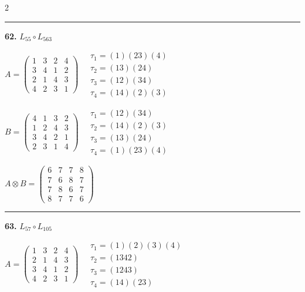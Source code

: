 \begin{multicols}{2}
\vspace{0.3em}
\hrule
\vspace{0.3em}

\noindent\textbf{62.} $L_{55} \circ L_{563}$

$A = \begin{pmatrix} 1 & 3 & 2 & 4 \\ 3 & 4 & 1 & 2 \\ 2 & 1 & 4 & 3 \\ 4 & 2 & 3 & 1 \end{pmatrix} \quad \begin{matrix} \tau_{1}=(1)(2 3)(4) \\ \tau_{2}=(1 3)(2 4) \\ \tau_{3}=(1 2)(3 4) \\ \tau_{4}=(1 4)(2)(3) \end{matrix}$

$B = \begin{pmatrix} 4 & 1 & 3 & 2 \\ 1 & 2 & 4 & 3 \\ 3 & 4 & 2 & 1 \\ 2 & 3 & 1 & 4 \end{pmatrix} \quad \begin{matrix} \tau_{1}=(1 2)(3 4) \\ \tau_{2}=(1 4)(2)(3) \\ \tau_{3}=(1 3)(2 4) \\ \tau_{4}=(1)(2 3)(4) \end{matrix}$

$A \otimes B = \begin{pmatrix} 6 & 7 & 7 & 8 \\ 7 & 6 & 8 & 7 \\ 7 & 8 & 6 & 7 \\ 8 & 7 & 7 & 6 \end{pmatrix}$

\vspace{0.3em}
\hrule
\vspace{0.3em}

\noindent\textbf{63.} $L_{57} \circ L_{105}$

$A = \begin{pmatrix} 1 & 3 & 2 & 4 \\ 2 & 1 & 4 & 3 \\ 3 & 4 & 1 & 2 \\ 4 & 2 & 3 & 1 \end{pmatrix} \quad \begin{matrix} \tau_{1}=(1)(2)(3)(4) \\ \tau_{2}=(1 3 4 2) \\ \tau_{3}=(1 2 4 3) \\ \tau_{4}=(1 4)(2 3) \end{matrix}$


\end{multicols}
